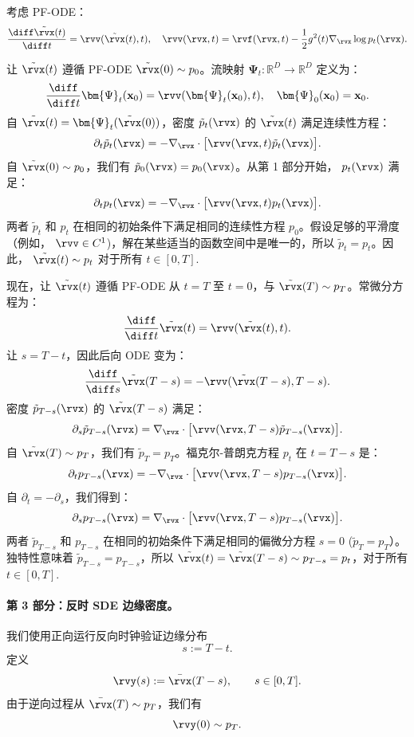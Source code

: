 考虑 PF-ODE：
\[
\frac{\diff \tilde\rvx(t)}{\diff t} = \rvv(\tilde\rvx(t), t), \quad \rvv(\rvx, t) = \rvf(\rvx, t) - \frac{1}{2} g^2(t) \nabla_{\rvx} \log p_t(\rvx).
\]

 让 $\tilde\rvx(t)$ 遵循 PF-ODE $\tilde\rvx(0) \sim p_0$。流映射 $\bm{\Psi}_t: \mathbb{R}^D \to \mathbb{R}^D$ 定义为：
\[
\frac{\diff}{\diff t} \bm{\Psi}_t(\mathbf{x}_0) = \rvv(\bm{\Psi}_t(\mathbf{x}_0), t), \quad \bm{\Psi}_0(\mathbf{x}_0) = \mathbf{x}_0.
\]
自 $\tilde\rvx(t) = \bm{\Psi}_t(\tilde\rvx(0))$，密度 $\tilde p_t(\rvx)$ 的 $\tilde\rvx(t)$ 满足连续性方程：
\[
\partial_t \tilde p_t(\rvx) = -\nabla_{\rvx} \cdot \bigl[ \rvv(\rvx, t) \tilde p_t(\rvx) \bigr].
\]
自 $\tilde\rvx(0) \sim p_0$，我们有 $\tilde p_0(\rvx) = p_0(\rvx)$。从第 1 部分开始， $p_t(\rvx)$ 满足：
\[
\partial_t p_t(\rvx) = -\nabla_{\rvx} \cdot \bigl[ \rvv(\rvx, t) p_t(\rvx) \bigr].
\]
两者 $\tilde p_t$ 和 $p_t$ 在相同的初始条件下满足相同的连续性方程 $p_0$。假设足够的平滑度（例如， $\rvv \in C^1$)，解在某些适当的函数空间中是唯一的，所以 $\tilde p_t = p_t$。因此， $\tilde\rvx(t) \sim p_t$ 对于所有 $t \in [0, T]$.

\vspace{0.3cm}
 现在，让 $\tilde\rvx(t)$ 遵循 PF-ODE 从 $t = T$ 至 $t = 0$，与 $\tilde\rvx(T) \sim p_T$。常微分方程为：
\[
\frac{\diff}{\diff t} \tilde\rvx(t) = \rvv(\tilde\rvx(t), t).
\]
让 $s = T - t$，因此后向 ODE 变为：
\[
\frac{\diff}{\diff s} \tilde\rvx(T - s) = -\rvv(\tilde\rvx(T - s), T - s).
\]
密度 $\tilde p_{T-s}(\rvx)$ 的 $\tilde\rvx(T - s)$ 满足：
\[
\partial_s \tilde p_{T-s}(\rvx) = \nabla_{\rvx} \cdot \bigl[ \rvv(\rvx, T - s) \tilde p_{T-s}(\rvx) \bigr].
\]
自 $\tilde\rvx(T) \sim p_T$，我们有 $\tilde p_T = p_T$。福克尔-普朗克方程 $p_t$ 在 $t = T - s$ 是：
\[
\partial_t p_{T-s}(\rvx) = -\nabla_{\rvx} \cdot \bigl[ \rvv(\rvx, T - s) p_{T-s}(\rvx) \bigr].
\]
自 $\partial_t = -\partial_s$，我们得到：
\[
\partial_s p_{T-s}(\rvx) = \nabla_{\rvx} \cdot \bigl[ \rvv(\rvx, T - s) p_{T-s}(\rvx) \bigr].
\]
两者 $\tilde p_{T-s}$ 和 $p_{T-s}$ 在相同的初始条件下满足相同的偏微分方程 $s = 0$ ($\tilde p_T = p_T$）。独特性意味着 $\tilde p_{T-s} = p_{T-s}$，所以 $\tilde\rvx(t) = \tilde\rvx(T - s) \sim p_{T-s} = p_t$，对于所有 $t \in [0, T]$.

\paragraph{第 3 部分：反时 SDE 边缘密度。}
我们使用正向运行反向时钟验证边缘分布
\[
s:=T-t.
\]
定义
\[
\rvy(s):=\bar\rvx(T-s),
\qquad s\in[0,T].
\]
由于逆向过程从 $\bar\rvx(T)\sim p_T$，我们有
\[
\rvy(0)\sim p_T.
\]

